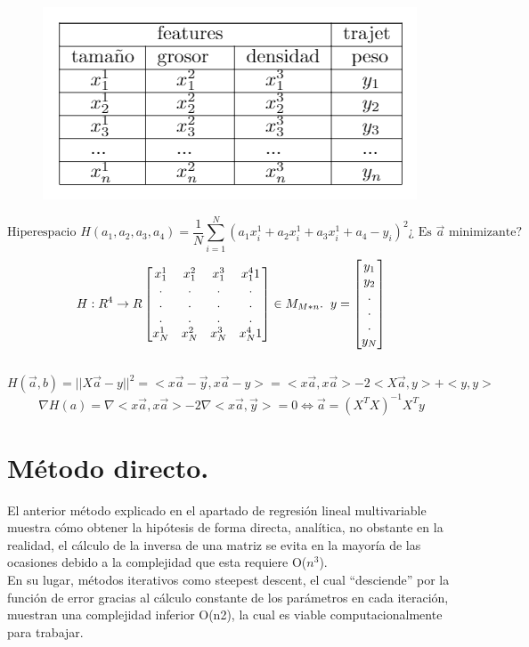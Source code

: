 \documentclass[a4paper,10pt]{article}
\begin{document}
\begin{figure}[H]
\centering
\includegraphics[scale=0.8]{Annotation 2020-03-23 133547}
\end{figure}
 \[\text{Hiperespacio } H(a_{1},a_{2},a_{3},a_{4})=\frac{1}{N}\sum_{i=1}^{N}(a_{1}x_i^1+a_{2}x_i^1+a_{3}x_i^1+a_{4}-y_{i})^2 \text{¿ Es } \vec{a}\text{ minimizante?}
\]
\[H:R^4\rightarrow R \begin{bmatrix}
    x_{1}^1 & x_{1}^2 & x_{1}^3 & x_{1}^4 1 \\
    .&.&.&.\\
    .&.&.&.\\
    .&.&.&.\\
    x_{N}^1 & x_{N}^2 & x_{N}^3 & x_{N}^4 1
\end{bmatrix} \in M_{M*n}. \hspace{0.20cm} y=\begin{bmatrix}y_{1}\\y_{2}\\.\\.\\.\\y_{N}\end{bmatrix}\] \\ \[H(\vec{a},b)=||X\vec{a}-y||^2 = <x\vec{a}-\vec{y},x\vec{a}-y>=<x\vec{a},x\vec{a}>-2<X\vec{a},y>+<y,y>\]
\[\nabla H(a)=\nabla<x\vec{a},x\vec{a}>-2\nabla<x\vec{a},\vec{y}>=0\Leftrightarrow \boxed{ \vec{a}=(X^T X)^{-1} X^T y}\]

\section{Método directo.}
\noindent
El anterior método explicado en el apartado de regresión lineal multivariable muestra cómo obtener la hipótesis de forma directa, analítica, no obstante en la realidad, el cálculo de la inversa de una matriz se evita en la mayoría de las ocasiones debido a la complejidad que esta requiere O($n^3$).\\
En su lugar, métodos iterativos como steepest descent, el cual “desciende” por la función de error gracias al cálculo constante de los parámetros en cada iteración, muestran una complejidad inferior O(n2), la cual es viable computacionalmente para trabajar. 
\end{document}
